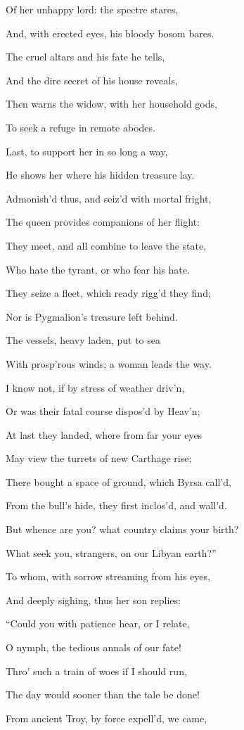 Of her unhappy lord: the spectre stares,

And, with erected eyes, his bloody bosom bares.

The cruel altars and his fate he tells,

And the dire secret of his house reveals,

Then warns the widow, with her household gods,

To seek a refuge in remote abodes.

Last, to support her in so long a way,

He shows her where his hidden treasure lay.

Admonish’d thus, and seiz’d with mortal fright,

The queen provides companions of her flight:

They meet, and all combine to leave the state,

Who hate the tyrant, or who fear his hate.

They seize a fleet, which ready rigg’d they find;

Nor is Pygmalion’s treasure left behind.

The vessels, heavy laden, put to sea

With prosp’rous winds; a woman leads the way.

I know not, if by stress of weather driv’n,

Or was their fatal course dispos’d by Heav’n;

At last they landed, where from far your eyes

May view the turrets of new Carthage rise;

There bought a space of ground, which Byrsa call’d,

From the bull’s hide, they first inclos’d, and wall’d.

But whence are you? what country claims your birth?

What seek you, strangers, on our Libyan earth?”

To whom, with sorrow streaming from his eyes,

And deeply sighing, thus her son replies:

“Could you with patience hear, or I relate,

O nymph, the tedious annals of our fate!

Thro’ such a train of woes if I should run,

The day would sooner than the tale be done!

From ancient Troy, by force expell’d, we came,

